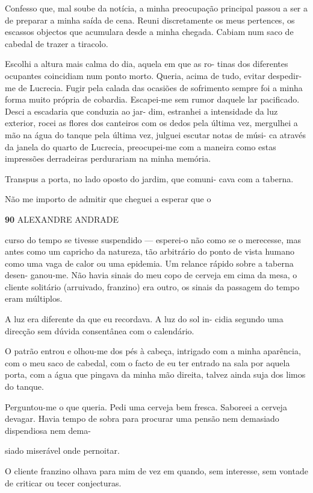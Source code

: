 Confesso que, mal soube da notícia, a minha preocupação principal passou
a ser a de preparar a minha saída de cena. Reuni discretamente os meus
pertences, os escassos objectos que acumulara desde a minha chegada.
Cabiam num saco de cabedal de trazer a tiracolo.

Escolhi a altura mais calma do dia, aquela em que as ro- tinas dos
diferentes ocupantes coincidiam num ponto morto. Queria, acima de tudo,
evitar despedir-me de Lucrecia. Fugir pela calada das ocasiões de
sofrimento sempre foi a minha forma muito própria de cobardia.
Escapei-me sem rumor daquele lar pacificado. Desci a escadaria que
conduzia ao jar- dim, estranhei a intensidade da luz exterior, rocei as
flores dos canteiros com os dedos pela última vez, mergulhei a mão na
água do tanque pela última vez, julguei escutar notas de músi- ca
através da janela do quarto de Lucrecia, preocupei-me com a maneira como
estas impressões derradeiras perdurariam na minha memória.

Transpus a porta, no lado oposto do jardim, que comuni- cava com a
taberna.

Não me importo de admitir que cheguei a esperar que o

\textbf{90 }ALEXANDRE ANDRADE

curso do tempo se tivesse suspendido --- esperei-o não como se o
merecesse, mas antes como um capricho da natureza, tão arbitrário do
ponto de vista humano como uma vaga de calor ou uma epidemia. Um relance
rápido sobre a taberna desen- ganou-me. Não havia sinais do meu copo de
cerveja em cima da mesa, o cliente solitário (arruivado, franzino) era
outro, os sinais da passagem do tempo eram múltiplos.

A luz era diferente da que eu recordava. A luz do sol in- cidia segundo
uma direcção sem dúvida consentânea com o calendário.

O patrão entrou e olhou-me dos pés à cabeça, intrigado com a minha
aparência, com o meu saco de cabedal, com o facto de eu ter entrado na
sala por aquela porta, com a água que pingava da minha mão direita,
talvez ainda suja dos limos do tanque.

Perguntou-me o que queria. Pedi uma cerveja bem fresca. Saboreei a
cerveja devagar. Havia tempo de sobra para procurar uma pensão nem
demasiado dispendiosa nem dema-

siado miserável onde pernoitar.

O cliente franzino olhava para mim de vez em quando, sem interesse, sem
vontade de criticar ou tecer conjecturas.

